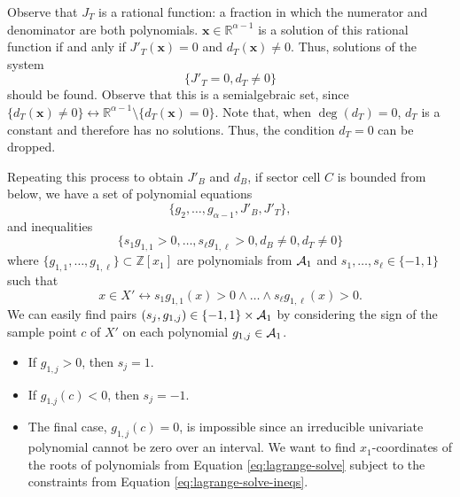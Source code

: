 \documentclass[
]{book}
\providecommand{\tightlist}{%
  \setlength{\itemsep}{0pt}\setlength{\parskip}{0pt}}
\theoremstyle{definition}
\theoremstyle{definition}
\theoremstyle{definition}
\theoremstyle{definition}
\theoremstyle{remark}
\begin{document}
Observe that \(J_T\) is a rational function: a fraction in which the numerator and denominator are both polynomials. \(\mathbf{x} \in \mathbb{R}^{\alpha - 1}\) is a solution of this rational function if and anly if \(J'_T(\mathbf{x}) = 0\) and \(d_T(\mathbf{x}) \ne 0\). Thus, solutions of the system \[
\{ J'_T = 0, d_T \ne 0 \}
\] should be found.
Observe that this is a semialgebraic set, since
\(\{ d_T(\mathbf{x}) \ne 0 \} \leftrightarrow \mathbb{R}^{\alpha - 1 } \setminus \{ d_T(\mathbf{x}) = 0 \}\).
Note that, when \(\deg(d_T) = 0\), \(d_T\) is a constant and therefore has no solutions. Thus, the condition \(d_T = 0\) can be dropped.

Repeating this process to obtain \(J'_B\) and \(d_B\), if sector cell \(C\) is bounded from below, we have a set of polynomial equations
\begin{equation}
\{ g_2,\ldots,g_{\alpha-1}, J'_B, J'_T \},
\label{eq:lagrange-solve}
\end{equation}
and inequalities
\begin{equation}
\{ s_1 g_{1,1} > 0, \ldots, s_\ell g_{1,\ell} > 0, d_B \ne 0, d_T \ne 0 \}
\label{eq:lagrange-solve-ineqs}
\end{equation}
where \(\{ g_{1,1},\ldots,g_{1,\ell} \} \subset \mathbb{Z}[x_1]\) are polynomials from \({\cal A}_1\) and \(s_1,\ldots,s_\ell \in \{-1,1\}\) such that \[
x \in X' \leftrightarrow s_1 g_{1,1}(x) > 0 \land \ldots \land s_\ell g_{1,\ell}(x) > 0.
\]
We can easily find pairs \((s_j, g_{1,j}) \in \{-1,1\} \times {\cal A}_1\) by considering the sign of the sample point \(c\) of \(X'\) on each polynomial \(g_{1,j} \in {\cal A}_1\).

\begin{itemize}
\tightlist
\item
  If \(g_{1,j} > 0\), then \(s_j = 1\).
\item
  If \(g_{1.j}(c) < 0\), then \(s_j = -1\).
\item
  The final case, \(g_{1,j}(c) = 0\), is impossible since an irreducible univariate polynomial cannot be zero over an interval.
  We want to find \(x_1\)-coordinates of the roots of polynomials from Equation \eqref{eq:lagrange-solve} subject to the constraints from Equation \eqref{eq:lagrange-solve-ineqs}.
\end{itemize}
\end{document}
